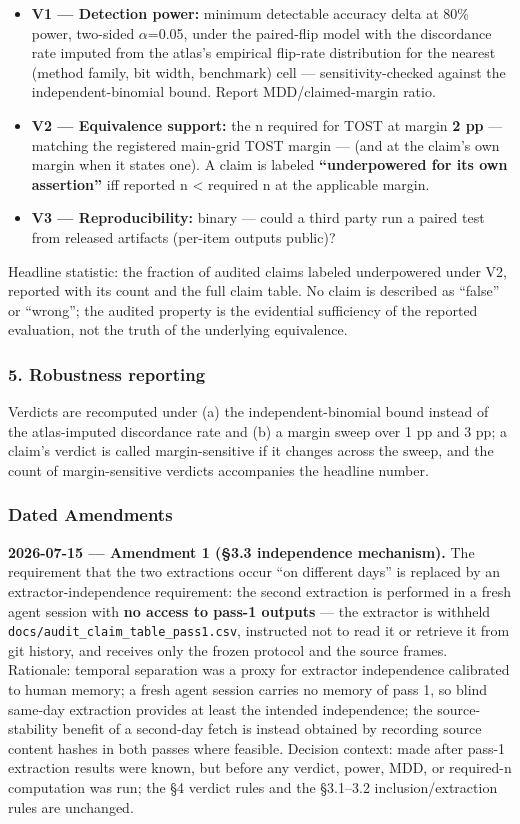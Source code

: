 \begin{itemize}
\item \textbf{V1 --- Detection power:} minimum detectable accuracy delta at 80\% power, two-sided $\alpha$=0.05, under the paired-flip model with the discordance rate imputed from the atlas's empirical flip-rate distribution for the nearest (method family, bit width, benchmark) cell --- sensitivity-checked against the independent-binomial bound. Report MDD/claimed-margin ratio.
\item \textbf{V2 --- Equivalence support:} the n required for TOST at margin \textbf{2 pp} --- matching the registered main-grid TOST margin --- (and at the claim's own margin when it states one). A claim is labeled \textbf{``underpowered for its own assertion''} iff reported n < required n at the applicable margin.
\item \textbf{V3 --- Reproducibility:} binary --- could a third party run a paired test from released artifacts (per-item outputs public)?
\end{itemize}
Headline statistic: the fraction of audited claims labeled underpowered under V2, reported with its count and the full claim table. No claim is described as ``false'' or ``wrong''; the audited property is the evidential sufficiency of the reported evaluation, not the truth of the underlying equivalence.

\subsubsection{5. Robustness reporting}
Verdicts are recomputed under (a) the independent-binomial bound instead of the atlas-imputed discordance rate and (b) a margin sweep over 1 pp and 3 pp; a claim's verdict is called margin-sensitive if it changes across the sweep, and the count of margin-sensitive verdicts accompanies the headline number.

\subsubsection{Dated Amendments}
\textbf{2026-07-15 --- Amendment 1 (\S{}3.3 independence mechanism).} The requirement that the two extractions occur ``on different days'' is replaced by an extractor-independence requirement: the second extraction is performed in a fresh agent session with \textbf{no access to pass-1 outputs} --- the extractor is withheld \texttt{docs/\allowbreak{}audit\_claim\_table\_pass1.csv}, instructed not to read it or retrieve it from git history, and receives only the frozen protocol and the source frames. Rationale: temporal separation was a proxy for extractor independence calibrated to human memory; a fresh agent session carries no memory of pass 1, so blind same-day extraction provides at least the intended independence; the source-stability benefit of a second-day fetch is instead obtained by recording source content hashes in both passes where feasible. Decision context: made after pass-1 extraction results were known, but before any verdict, power, MDD, or required-n computation was run; the \S{}4 verdict rules and the \S{}3.1--3.2 inclusion/extraction rules are unchanged.


